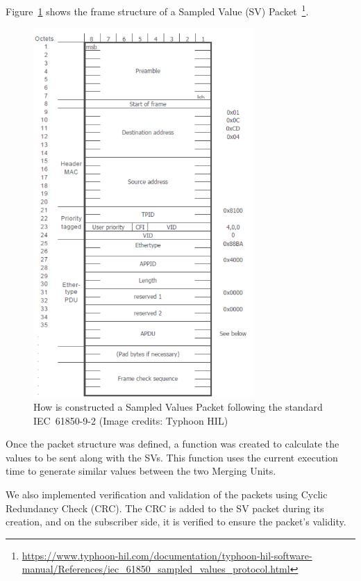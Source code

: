 Figure~\ref{fig:sv_packet} shows the frame structure of a Sampled Value (SV) Packet~\footnote{\url{https://www.typhoon-hil.com/documentation/typhoon-hil-software-manual/References/iec_61850_sampled_values_protocol.html}}.

\begin{figure}[tbh!]
	\centering
	\includegraphics[width=0.75\textwidth, keepaspectratio]{ch4/assets/SV_Packtes.png} %
	\caption{How is constructed a Sampled Values Packet following the standard IEC~61850-9-2 (Image credits: Typhoon HIL)}
	\label{fig:sv_packet}
\end{figure}


Once the packet structure was defined, a function was created to calculate the values to be sent along with the SVs. This function uses the current execution time to generate similar values between the two Merging Units.

We also implemented verification and validation of the packets using Cyclic Redundancy Check (CRC). The CRC is added to the SV packet during its creation, and on the subscriber side, it is verified to ensure the packet's validity.

